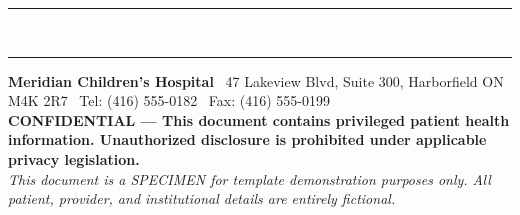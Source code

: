 \documentclass[11pt,a4paper]{article}
\begin{document}
\vspace{3mm}

{\color{PedTeal}\rule{\linewidth}{0.4pt}}\\[-3pt]
{\color{PedBlue}\rule{\linewidth}{1.5pt}}

\vspace{1mm}
{\footnotesize\color{GrayText}\centering
\textbf{Meridian Children's Hospital} \textbar\
47 Lakeview Blvd, Suite 300, Harborfield ON M4K 2R7 \textbar\
Tel: (416) 555-0182 \textbar\ Fax: (416) 555-0199\\
\textbf{CONFIDENTIAL --- This document contains privileged patient health information.
Unauthorized disclosure is prohibited under applicable privacy legislation.}\\
\textit{This document is a SPECIMEN for template demonstration purposes only.
All patient, provider, and institutional details are entirely fictional.}
}
\end{document}
